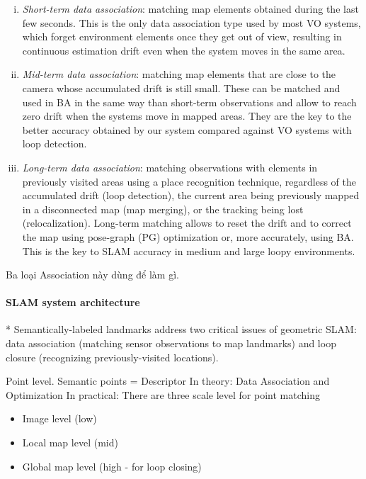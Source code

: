 \documentclass[review]{elsarticle}
\begin{document}
\begin{enumerate}[(i)]
	\item \textit{Short-term data association}: matching map elements obtained during the last few seconds. This is the only data association type used by most VO systems, which forget environment elements once they get out of view, resulting in continuous estimation drift even when the system moves in the same area.

	\item \textit{Mid-term data association}: matching map elements that are close to the camera whose accumulated drift is still small. These can be matched and used in BA in the same way than short-term observations and allow to reach zero drift when the systems move in mapped areas. They are the key to the better accuracy obtained by our system compared against VO systems with loop detection.

	\item \textit{Long-term data association}: matching observations with elements in previously visited areas using a place recognition technique, regardless of the accumulated drift (loop detection), the current area being previously mapped in a disconnected map (map merging), or the tracking being lost (relocalization). Long-term matching allows to reset the drift and to correct the map using pose-graph (PG) optimization or, more accurately, using BA. This is the key to SLAM accuracy in medium and large loopy environments.
\end{enumerate}

Ba loại Association này dùng để làm gì.

\paragraph{SLAM system architecture} 

* Semantically-labeled landmarks address two critical issues of geometric SLAM: data association (matching sensor observations to map landmarks) and loop closure (recognizing previously-visited locations).

Point level.
Semantic points = Descriptor
In theory: Data Association and Optimization
In practical: There are three scale level for point matching

\begin{itemize}
	\item Image level (low)
	\item Local map level (mid)
	\item Global map level (high - for loop closing)
\end{itemize}
\end{document}
